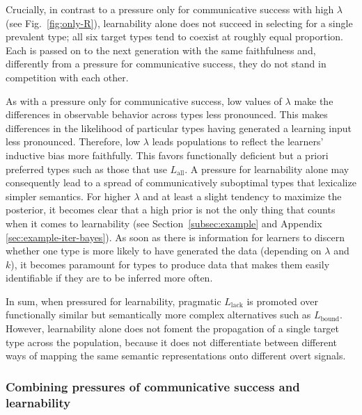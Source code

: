 \documentclass[a4paper, 11pt]{article}
\theoremstyle{Satz}
\newcommand{\mylang}[1]{\ensuremath{L_{\text{#1}}}\xspace} %
\newcommand{\Lall}{\mylang{all}}
\newcommand{\Lbound}{\mylang{bound}}
\newcommand{\Llack}{\mylang{lack}}
\begin{document}
Crucially, in contrast to a pressure only for communicative success with high $\lambda$ (see
Fig.~\ref{fig:only-R}), learnability alone does not succeed in selecting for a single
prevalent type; all six target types tend to coexist at roughly equal proportion. Each
is passed on to the next generation with the same faithfulness and, differently from a pressure
for communicative success, they do not stand in competition with each other. 

As with a pressure only for communicative success, low values of $\lambda$ make the differences
in observable behavior across types less pronounced. This makes differences in the likelihood
of particular types having generated a learning input less pronounced. Therefore, low $\lambda$
leads populations to reflect the learners' inductive bias more faithfully. This favors
functionally deficient but a priori preferred types such as those that use $\Lall$. A pressure
for learnability alone may consequently lead to a spread of communicatively suboptimal types
that lexicalize simpler semantics. For higher $\lambda$ and at least a slight tendency to maximize the posterior, it
becomes clear that a high prior is not the only thing that counts when it comes to learnability
(see Section~\ref{subsec:example} and Appendix \ref{sec:example-iter-bayes}). As soon as there is information for learners to discern
whether one type is more likely to have generated the data (depending on $\lambda$ and $k$), it
becomes paramount for types to produce data that makes them easily identifiable if they are to
be inferred more often.

In sum, when pressured for learnability, pragmatic $\Llack$ is promoted over functionally
similar but semantically more complex alternatives such as $\Lbound$. However, learnability
alone does not foment the propagation of a single target type across the population, because it
does not differentiate between different ways of mapping the same semantic representations onto
different overt signals.


\subsubsection{Combining pressures of communicative success and learnability}
\end{document}
